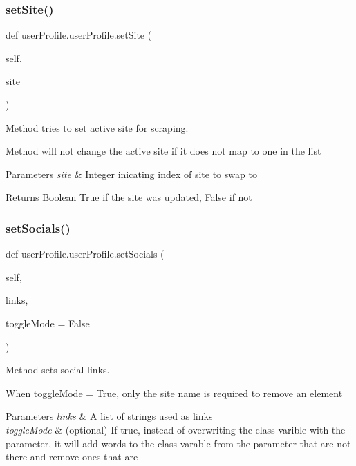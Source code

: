 \subsubsection{\texorpdfstring{set\+Site()}{setSite()}}
{\footnotesize\ttfamily def user\+Profile.\+user\+Profile.\+set\+Site (\begin{DoxyParamCaption}\item[{}]{self,  }\item[{}]{site }\end{DoxyParamCaption})}



Method tries to set active site for scraping. 

Method will not change the active site if it does not map to one in the list 
\begin{DoxyParams}{Parameters}
{\em site} & Integer inicating index of site to swap to \\
\hline
\end{DoxyParams}
\begin{DoxyReturn}{Returns}
Boolean True if the site was updated, False if not 
\end{DoxyReturn}
\mbox{\label{classuserProfile_1_1userProfile_a4e47efdac8d7178519309a72b81cc8c0}} 
\subsubsection{\texorpdfstring{set\+Socials()}{setSocials()}}
{\footnotesize\ttfamily def user\+Profile.\+user\+Profile.\+set\+Socials (\begin{DoxyParamCaption}\item[{}]{self,  }\item[{}]{links,  }\item[{}]{toggle\+Mode = {\ttfamily False} }\end{DoxyParamCaption})}



Method sets social links. 

When toggle\+Mode = True, only the site name is required to remove an element 
\begin{DoxyParams}{Parameters}
{\em links} & A list of strings used as links \\
\hline
{\em toggle\+Mode} & (optional) If true, instead of overwriting the class varible with the parameter, it will add words to the class varable from the parameter that are not there and remove ones that are \\
\hline
\end{DoxyParams}
\mbox{\label{classuserProfile_1_1userProfile_a33423b70af186c953dc94e302cc717d3}} 
